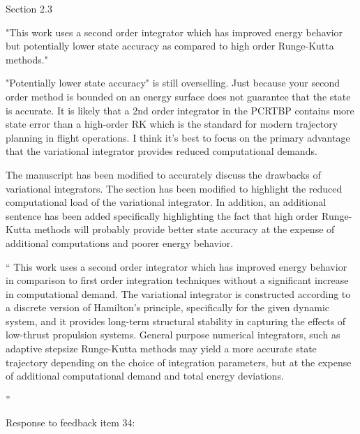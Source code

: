 \documentclass[11pt]{article}
\newenvironment{correction}{\begin{list}{}{\setlength{\leftmargin}{1cm}\setlength{\rightmargin}{1cm}}\vspace{\parsep}\item[]``}{''\end{list}}
\begin{document}
\begin{itemize}
    \item 
        \begin{itshape}
            Section 2.3

            "This work uses a second order integrator which has improved energy behavior but potentially lower state accuracy as compared to high order Runge-Kutta methods."

            "Potentially lower state accuracy" is still overselling.  Just because your second order method is bounded on an energy surface does not guarantee that the state is accurate.  It is likely that a 2nd order integrator in the PCRTBP contains more state error than a high-order RK which is the standard for modern trajectory planning in flight operations.  I think it's best to focus on the primary advantage that the variational integrator provides reduced computational demands.
        \end{itshape}
    
    The manuscript has been modified to accurately discuss the drawbacks of variational integrators.
    The section has been modified to highlight the reduced computational load of the variational integrator.
    In addition, an additional sentence has been added specifically highlighting the fact that high order Runge-Kutta methods will probably provide better state accuracy at the expense of additional computations and poorer energy behavior.
    
    \begin{correction}
        This work uses a second order integrator which has improved energy behavior in comparison to first order integration techniques without a significant increase in computational demand.
        The variational integrator is constructed according to a discrete version of Hamilton's principle, specifically for the given dynamic system, and it provides long-term structural stability in capturing the effects of low-thrust propulsion systems.
        General purpose numerical integrators, such as adaptive stepsize Runge-Kutta methods may yield a more accurate state trajectory depending on the choice of integration parameters, but at the expense of additional computational demand and total energy deviations.

    \end{correction}
    \item \begin{itshape}
            Response to feedback item 34:


\end{itshape}
\end{itemize}
\end{document}
